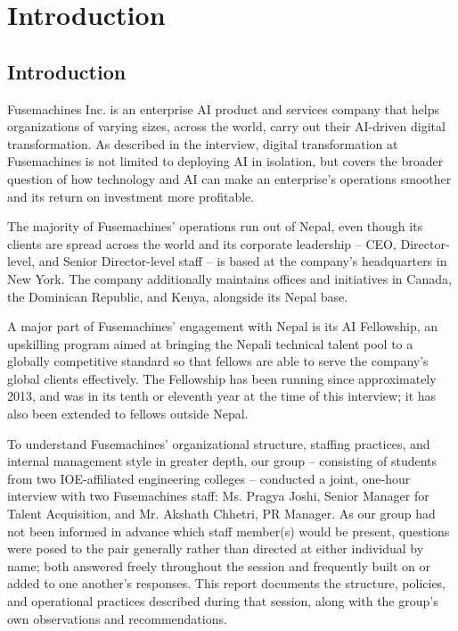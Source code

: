 \documentclass[12pt,a4paper]{report}
\begin{document}
\tableofcontents

\chapter{Introduction}

\section{Introduction}

Fusemachines Inc. is an enterprise AI product and services company that helps organizations of varying sizes, across the world, carry out their AI-driven digital transformation. As described in the interview, digital transformation at Fusemachines is not limited to deploying AI in isolation, but covers the broader question of how technology and AI can make an enterprise's operations smoother and its return on investment more profitable.

The majority of Fusemachines' operations run out of Nepal, even though its clients are spread across the world and its corporate leadership -- CEO, Director-level, and Senior Director-level staff -- is based at the company's headquarters in New York. The company additionally maintains offices and initiatives in Canada, the Dominican Republic, and Kenya, alongside its Nepal base.

A major part of Fusemachines' engagement with Nepal is its AI Fellowship, an upskilling program aimed at bringing the Nepali technical talent pool to a globally competitive standard so that fellows are able to serve the company's global clients effectively. The Fellowship has been running since approximately 2013, and was in its tenth or eleventh year at the time of this interview; it has also been extended to fellows outside Nepal.

To understand Fusemachines' organizational structure, staffing practices, and internal management style in greater depth, our group -- consisting of students from two IOE-affiliated engineering colleges -- conducted a joint, one-hour interview with two Fusemachines staff: Ms. Pragya Joshi, Senior Manager for Talent Acquisition, and Mr. Akshath Chhetri, PR Manager. As our group had not been informed in advance which staff member(s) would be present, questions were posed to the pair generally rather than directed at either individual by name; both answered freely throughout the session and frequently built on or added to one another's responses. This report documents the structure, policies, and operational practices described during that session, along with the group's own observations and recommendations.
\end{document}
